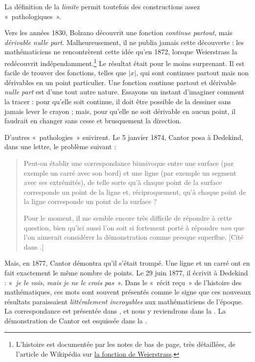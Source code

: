 \documentclass[../../../include/open-logic-section]{subfiles}
\begin{document}

La définition de la \emph{limite} permit toutefois des constructions
assez «~pathologiques~».

Vers les années 1830, Bolzano découvrit une fonction
\emph{continue partout}, mais \emph{dérivable nulle part}.
Malheureusement, il ne publia jamais cette découverte : les
mathématiciens ne rencontrèrent cette idée qu'en 1872, lorsque
Weierstrass la redécouvrit indépendamment.\footnote{L'histoire est
documentée par les notes de bas de page, très détaillées, de
l'article de Wikipédia sur
\href{http://en.wikipedia.org/wiki/Weierstrass_function}{la
fonction de Weierstrass}.} Le résultat était pour le moins
surprenant. Il est facile de trouver des fonctions, telles que
$|x|$, qui sont continues partout mais non dérivables en un point
particulier. Une fonction continue partout et dérivable
\emph{nulle part} est d'une tout autre nature. Essayons un instant
d'imaginer comment la tracer : pour qu'elle soit continue, il doit
être possible de la dessiner sans jamais lever le crayon ; mais,
pour qu'elle ne soit dérivable en aucun point, il faudrait en changer
sans cesse et brusquement la direction.

D'autres «~pathologies~» suivirent. Le 5 janvier 1874, Cantor posa
à Dedekind, dans une lettre, le problème suivant :
\begin{quote}
Peut-on établir une correspondance biunivoque entre une surface
(par exemple un carré avec son bord) et une ligne (par exemple un
segment avec ses extrémités), de telle sorte qu'à chaque point de
la surface corresponde un point de la ligne et, réciproquement,
qu'à chaque point de la ligne corresponde un point de la surface ?

Pour le moment, il me semble encore très difficile de répondre à
cette question, bien qu'ici aussi l'on soit si fortement porté à
répondre \emph{non} que l'on aimerait considérer la démonstration
comme presque superflue. [Cité dans \citealt{Gouvea2011}.]
\end{quote}
Mais, en 1877, Cantor démontra qu'il s'était trompé. Une ligne et
un carré ont en fait exactement le même nombre de points. Le
29 juin 1877, il écrivit à Dedekind :
«~\emph{je le vois, mais je ne le crois pas}~». Dans le
«~récit reçu~» de l'histoire des mathématiques, ces mots sont
souvent présentés comme le signe que ces nouveaux résultats
paraissaient \emph{littéralement incroyables} aux mathématiciens
de l'époque. La correspondance est présentée dans
\citet{Gouvea2011}, et nous y reviendrons dans la
. La démonstration de Cantor est
esquissée dans la .
\end{document}
